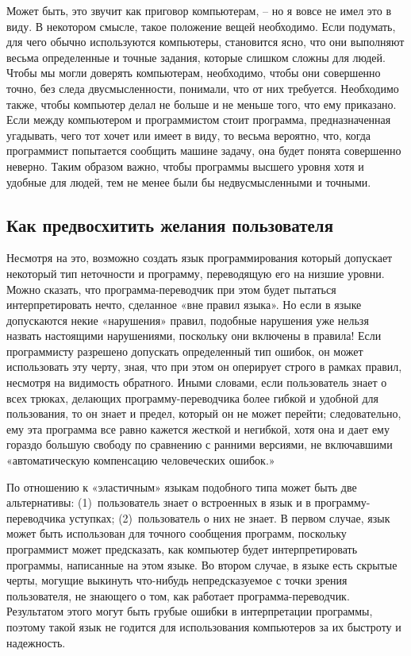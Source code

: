 \documentclass[../main.tex]{subfiles}
\begin{document}
Может быть, это звучит как приговор компьютерам, \--- но я вовсе не имел это в виду. В некотором смысле, такое положение вещей необходимо. Если подумать, для чего обычно используются компьютеры, становится ясно, что они выполняют весьма определенные и точные задания, которые слишком сложны для людей. Чтобы мы могли доверять компьютерам, необходимо, чтобы они совершенно точно, без следа двусмысленности, понимали, что от них требуется. Необходимо также, чтобы компьютер делал не больше и не меньше того, что ему приказано. Если между компьютером и программистом стоит программа, предназначенная угадывать, чего тот хочет или имеет в виду, то весьма вероятно, что, когда программист попытается сообщить машине задачу, она будет понята совершенно неверно. Таким образом важно, чтобы программы высшего уровня хотя и удобные для людей, тем не менее были бы недвусмысленными и точными.


\subsection{Как предвосхитить желания пользователя}

Несмотря на это, возможно создать язык программирования который допускает некоторый тип неточности и программу, переводящую его на низшие уровни. Можно сказать, что программа-переводчик при этом будет пытаться интерпретировать нечто, сделанное «вне правил языка». Но если в языке допускаются некие «нарушения» правил, подобные нарушения уже нельзя назвать настоящими нарушениями, поскольку они включены в правила! Если программисту разрешено допускать определенный тип ошибок, он может использовать эту черту, зная, что при этом он оперирует строго в рамках правил, несмотря на видимость обратного. Иными словами, если пользователь знает о всех трюках, делающих программу-переводчика более гибкой и удобной для пользования, то он знает и предел, который он не может перейти; следовательно, ему эта программа все равно кажется жесткой и негибкой, хотя она и дает ему гораздо большую свободу по сравнению с ранними версиями, не включавшими «автоматическую компенсацию человеческих ошибок.»

По отношению к «эластичным» языкам подобного типа может быть две альтернативы: (1)~пользователь знает о встроенных в язык и в программу-переводчика уступках; (2)~пользователь о них не знает. В первом случае, язык может быть использован для точного сообщения программ, поскольку программист может предсказать, как компьютер будет интерпретировать программы, написанные на этом языке. Во втором случае, в языке есть скрытые черты, могущие выкинуть что-нибудь непредсказуемое с точки зрения пользователя, не знающего о том, как работает программа-переводчик. Результатом этого могут быть грубые ошибки в интерпретации программы, поэтому такой язык не годится для использования компьютеров за их быстроту и надежность.
\end{document}

